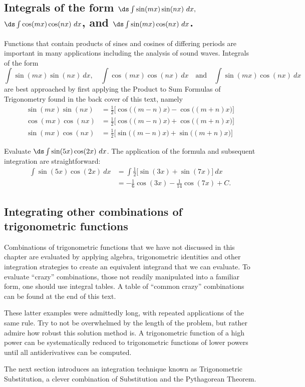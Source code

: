 \subsection{\texorpdfstring{Integrals of the form $\ds \int\sin(mx)\sin(nx)\ dx,$ $\ds\int \cos(mx)\cos(nx)\ dx$, and $\ds\int \sin(mx)\cos(nx)\ dx$.}{Integrands of the form sin(mx)sin(nx), cos(mx)cos(nx), and sin(mx)cos(nx)}}

Functions that contain products of sines and cosines of differing periods are important in many applications including the analysis of sound waves. Integrals of the form 
\[
\int\sin(mx)\sin(nx)\ dx,\quad \int \cos(mx)\cos(nx)\ dx \quad \text{and}\quad\int \sin(mx)\cos(nx)\ dx
\]
are best approached by first applying the Product to Sum Formulas of Trigonometry found in the back cover of this text, namely
\begin{align*}
\sin(mx)\sin(nx) &= \frac12\Big[\cos\big((m-n)x\big)-\cos\big((m+n)x\big)\Big] \\
\cos(mx)\cos(nx) &= \frac12\Big[\cos\big((m-n)x\big)+\cos\big((m+n)x\big)\Big] \\
\sin(mx)\cos(nx) &=	\frac12\Big[\sin\big((m-n)x\big)+\sin\big((m+n)x\big)\Big]
\end{align*}

\begin{example}\label{ex_trigint4}
Evaluate $\ds\int\sin(5x)\cos(2x)\ dx$.
\solution
The application of the formula and subsequent integration are straightforward:
\begin{align*}
	\int\sin(5x)\cos(2x)\ dx
	&= \int \frac12\Big[\sin(3x)+\sin(7x)\Big]\ dx \\
	&= -\frac16\cos(3x) - \frac1{14}\cos(7x) + C.
\end{align*}
\end{example}

\subsection{Integrating other combinations of trigonometric functions}

Combinations of trigonometric functions that we have not discussed in this chapter are evaluated by applying algebra, trigonometric identities and other integration strategies to create an equivalent integrand that we can evaluate. To evaluate ``crazy'' combinations, those not readily manipulated into a familiar form, one should use integral tables. A table of ``common crazy'' combinations can be found at the end of this text.

These latter examples were admittedly long, with repeated applications of the same rule. Try to not be overwhelmed by the length of the problem, but rather admire how robust this solution method is. A trigonometric function of a high power can be systematically reduced to trigonometric functions of lower powers until all antiderivatives can be computed. 

The next section introduces an integration technique known as Trigonometric Substitution, a clever combination of Substitution and the Pythagorean Theorem.

